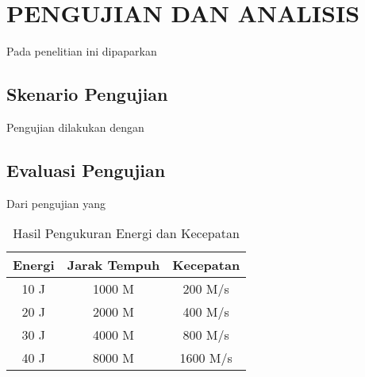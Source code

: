 \chapter{PENGUJIAN DAN ANALISIS}
\label{chap:pengujiananalisis}


Pada penelitian ini dipaparkan \lipsum[1][1-5]

\section{Skenario Pengujian}
\label{sec:skenariopengujian}

Pengujian dilakukan dengan \lipsum[1-2]

\section{Evaluasi Pengujian}
\label{sec:analisispengujian}

Dari pengujian yang \lipsum[1]

\begin{longtable}{|c|c|c|}
  \caption{Hasil Pengukuran Energi dan Kecepatan}
  \label{tb:EnergiKecepatan}\\
  \hline
  \rowcolor[HTML]{C0C0C0}
  \textbf{Energi} & \textbf{Jarak Tempuh} & \textbf{Kecepatan} \\
  \hline
  10 J & 1000 M & 200 M/s \\
  20 J & 2000 M & 400 M/s \\
  30 J & 4000 M & 800 M/s \\
  40 J & 8000 M & 1600 M/s \\
  \hline
\end{longtable}

\lipsum[2-4]
